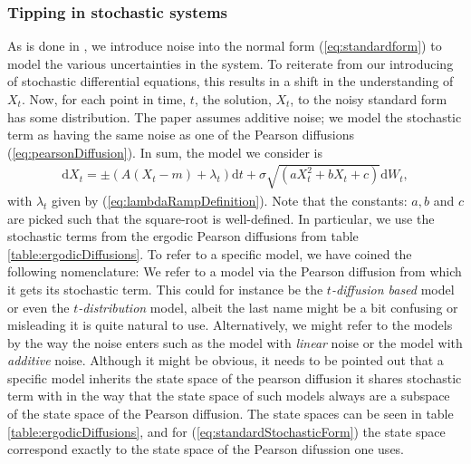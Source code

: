 \subsubsection{Tipping in stochastic systems}
As is done in \cite[equation (1)]{Ditlevsen2023}, we introduce noise into the normal form (\ref{eq:standardform}) to model the various uncertainties in the system. To reiterate from our introducing of stochastic differential equations, this results in a shift in the understanding of $X_t$. Now, for each point in time, $t$, the solution, $X_t$, to the noisy standard form has some distribution. The paper assumes additive noise; we model the stochastic term as having the same noise as one of the Pearson diffusions (\ref{eq:pearsonDiffusion}). In sum, the model we consider is
\begin{align}
    \mathrm{d}X_t = \pm\left(A\left(X_t - m\right) + \lambda_t\right)\mathrm{d}t + \sigma\sqrt{\left(aX_t^2 + bX_t + c\right)}\mathrm{d}W_t, \label{eq:standardStochasticForm}
\end{align}
with $\lambda_t$ given by (\ref{eq:lambdaRampDefinition}). Note that the constants: $a, b$ and $c$ are picked such that the square-root is well-defined. In particular, we use the stochastic terms from the ergodic Pearson diffusions from table \ref{table:ergodicDiffusions}. To refer to a specific model, we have coined the following nomenclature: We refer to a model via the Pearson diffusion from which it gets its stochastic term. This could for instance be the \textit{$t$-diffusion based} model or even the \textit{$t$-distribution} model, albeit the last name might be a bit confusing or misleading it is quite natural to use. Alternatively, we might refer to the models by the way the noise enters such as the model with \textit{linear} noise or the model with \textit{additive} noise. Although it might be obvious, it needs to be pointed out that a specific model inherits the state space of the pearson diffusion it shares stochastic term with in the way that the state space of such models always are a subspace of the state space of the Pearson diffusion. The state spaces can be seen in table \ref{table:ergodicDiffusions}, and for (\ref{eq:standardStochasticForm}) the state space correspond exactly to the state space of the Pearson difussion one uses.


